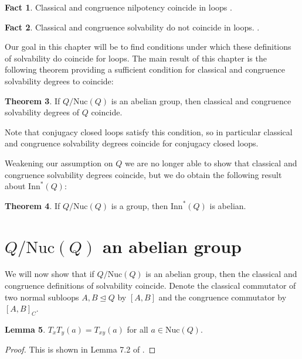 \documentclass[12pt]{report}
\theoremstyle{definition}
\newtheorem{thm}{Theorem}[chapter]
\newtheorem{fct}[thm]{Fact}
\newtheorem{lem}[thm]{Lemma}
\newcommand{\nuc}{\text{Nuc}}       %
\newcommand{\inn}{\text{Inn}}       %
\begin{document}
\begin{fct}
  Classical and congruence nilpotency coincide in loops \cite{ComTheory}.
\end{fct}

\begin{fct}
  Classical and congruence solvability do not coincide in loops. \cite{ComTheory}.
\end{fct}

Our goal in this chapter will be to find conditions under which these definitions of solvability
  do coincide for loops. The main result of this chapter is the following theorem providing a
  sufficient condition for classical and congruence solvability degrees to coincide: 

\begin{thm}
  If $Q/\nuc(Q)$ is an abelian group, then classical and congruence solvability degrees of $Q$ coincide.
\end{thm}

Note that conjugacy closed loops satisfy this condition, so in particular classical and congruence solvability degrees coincide
  for conjugacy closed loops.

Weakening our assumption on $Q$ we are no longer able to show that classical and congruence
  solvability degrees coincide, but we do obtain the following result about $\inn^*(Q)$:

\begin{thm}
  If $Q/\nuc(Q)$ is a group, then $\inn^*(Q)$ is abelian.
\end{thm}


\section{$Q/\nuc(Q)$ an abelian group}
\label{sec:nucVar}

We will now show that if $Q/\nuc(Q)$ is an abelian group, then the classical and congruence definitions
  of solvability coincide. Denote the classical commutator of two normal subloops $A, B\unlhd Q$ by
  $[A, B]$ and the congruence commutator by $[A, B]_C$.

\begin{lem}\label{buch-lem}
  $T_x T_y (a) = T_{xy}(a)$ for all $a\in \nuc(Q)$.
\end{lem}

\begin{proof}
  This is shown in Lemma 7.2 of \cite{buch}.
\end{proof}
\end{document}
